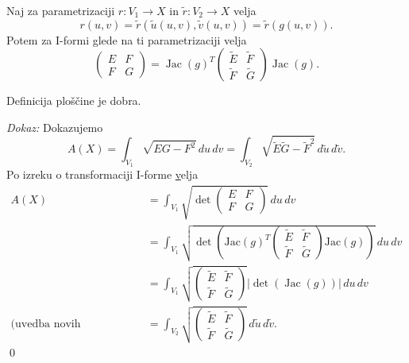 \begin{izrek}
\label{izr_transformacija_1_forme}
  Naj za parametrizaciji $r: V_1 \to  X$ in $\tilde{r}: V_2 \to X$ velja 
  \begin{equation*} r(u,v) = \tilde{r}(\tilde{u}(u,v), \tilde{v}(u,v)) = \tilde{r}(g(u,v)).\end{equation*}Potem za I-formi glede na ti parametrizaciji velja 
  \begin{equation*} \begin{pmatrix}
  E & F \\
  F & G
  \end{pmatrix} = \operatorname{Jac}(g)^{T}
  \begin{pmatrix}
    \tilde{E} & \tilde{F} \\
    \tilde{F} & \tilde{G}
    \end{pmatrix}
  \operatorname{Jac}(g). \end{equation*}
\end{izrek}

\begin{posledica}
\label{psl_dobra_definiranost_ploscine}
 Definicija ploščine \href{def_ploscina_plosvke} je dobra.
\end{posledica}
\noindent
{\em Dokaz:\/}
 Dokazujemo 
 \begin{equation*} A(X) = \int_{V_1} \sqrt{EG - F^2}   \, du \, dv = \int_{V_2}  \sqrt{\tilde{E}\tilde{G} -  \tilde{F}^2}  \, d \tilde{u} \, d \tilde{v}.\end{equation*}
 Po izreku o transformaciji I-forme \href{izr_transformacija_1_forme} velja 
 \begin{align*}
     A(X) &= \int_{V_1} \sqrt{\det \begin{pmatrix}
     E & F \\
     F & G
     \end{pmatrix}}   \, du \, dv \\
      &= \int_{V_1}  \sqrt{\det \left( \text{Jac}(g)^{T}
      \begin{pmatrix}
        \tilde{E} & \tilde{F} \\
        \tilde{F} & \tilde{G}
        \end{pmatrix}
      \text{Jac}(g) \right) }   \, du \, dv \\ 
      &= \int_{V_1} \sqrt{\begin{pmatrix}
        \tilde{E} & \tilde{F} \\
        \tilde{F} & \tilde{G}
      \end{pmatrix}} \left| \det \left( \operatorname{Jac}(g) \right) \right|  \, du \, dv \\ 
     \text{(uvedba novih spremenljivk)} &= \int_{V_2} \sqrt{\begin{pmatrix}
      \tilde{E} & \tilde{F} \\
      \tilde{F} & \tilde{G}
      \end{pmatrix}}   \, d \tilde{u} \, d \tilde{v}.  
 \end{align*}
\qed

